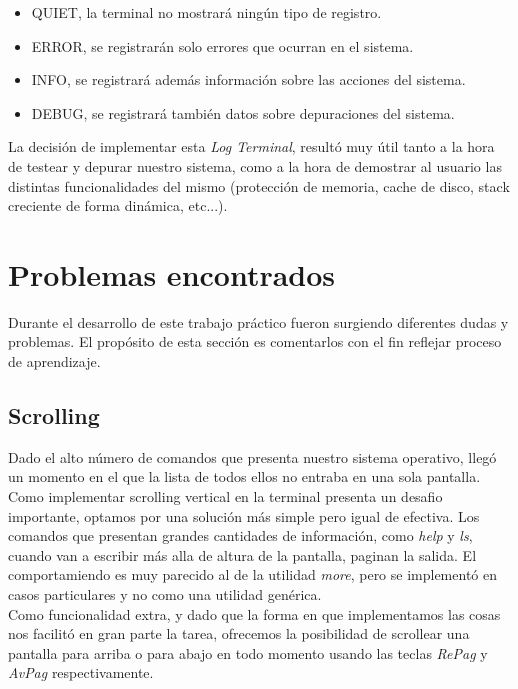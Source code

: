 \documentclass[a4paper,10pt]{article}
\begin{document}
        \begin{itemize}
        \item QUIET, la terminal no mostrará ningún tipo de registro.
        \item ERROR, se registrarán solo errores que ocurran en el sistema.
        \item INFO, se registrará además información sobre las acciones del sistema.
        \item DEBUG, se registrará también datos sobre depuraciones del sistema.
        \end{itemize}

        La decisión de implementar esta \textit{Log Terminal}, resultó muy útil tanto a la hora de testear y depurar nuestro sistema, como a la hora de demostrar al 
        usuario las distintas funcionalidades del mismo (protección de memoria, cache de disco, stack creciente de forma dinámica, etc...).\\


\newpage
\section{Problemas encontrados}
\label{sec:Problemas encontrados}

Durante el desarrollo de este trabajo práctico fueron surgiendo diferentes dudas y problemas. El propósito de esta
sección es comentarlos con el fin reflejar proceso de aprendizaje.

        \subsection{Scrolling}
        Dado el alto número de comandos que presenta nuestro sistema operativo, llegó un momento en el que la lista de todos ellos no entraba en una sola pantalla.
        Como implementar scrolling vertical en la terminal presenta un desafio importante, optamos por una solución más simple pero igual de efectiva.
        Los comandos que presentan grandes cantidades de información, como \textit{help} y \textit{ls}, cuando van a escribir más alla de altura de la pantalla, 
        paginan la salida.
        El comportamiendo es muy parecido al de la utilidad \textit{more}, pero se implementó en casos particulares y no como una utilidad genérica. \\


        Como funcionalidad extra, y dado que la forma en que implementamos las cosas nos facilitó en gran parte la tarea, ofrecemos la posibilidad de scrollear una 
        pantalla para arriba o para abajo en todo momento usando las teclas \textit{RePag} y \textit{AvPag} respectivamente.
\end{document}
